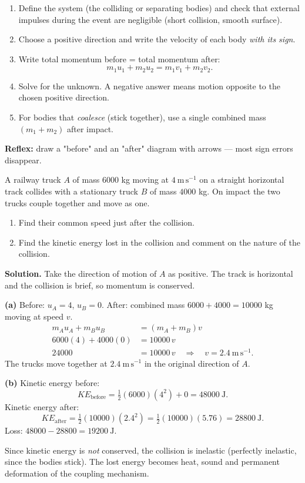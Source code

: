 \documentclass[11pt]{article}
\newcommand{\cle}[1]{{\popxbold\color{popdark}#1}}
\begin{document}
\begin{methode}
\begin{enumerate}
\item Define the \cle{system} (the colliding or separating bodies) and check that external impulses during the event are negligible (short collision, smooth surface).
\item Choose a positive direction and write the velocity of each body \emph{with its sign}.
\item Write total momentum before = total momentum after:
\[ m_1u_1+m_2u_2=m_1v_1+m_2v_2. \]
\item Solve for the unknown. A negative answer means motion opposite to the chosen positive direction.
\item For bodies that \emph{coalesce} (stick together), use a single combined mass $(m_1+m_2)$ after impact.
\end{enumerate}
\textbf{Reflex:} draw a "before" and an "after" diagram with arrows — most sign errors disappear.
\end{methode}

\begin{exoresolu}
A railway truck $A$ of mass $6000$ kg moving at $4\ \mathrm{m\,s^{-1}}$ on a straight horizontal track collides with a stationary truck $B$ of mass $4000$ kg. On impact the two trucks couple together and move as one.
\begin{enumerate}
\item[(a)] Find their common speed just after the collision.
\item[(b)] Find the kinetic energy lost in the collision and comment on the nature of the collision.
\end{enumerate}
\tcblower
\textbf{Solution.} Take the direction of motion of $A$ as positive. The track is horizontal and the collision is brief, so momentum is conserved.

\textbf{(a)} Before: $u_A=4$, $u_B=0$. After: combined mass $6000+4000=10000$ kg moving at speed $v$.
\begin{align*}
m_Au_A+m_Bu_B&=(m_A+m_B)v\\
6000(4)+4000(0)&=10000\,v\\
24000&=10000\,v \quad\Longrightarrow\quad v=2.4\ \mathrm{m\,s^{-1}}.
\end{align*}
The trucks move together at $2.4\ \mathrm{m\,s^{-1}}$ in the original direction of $A$.

\textbf{(b)} Kinetic energy before:
\[ KE_{\text{before}}=\tfrac12(6000)(4^2)+0=48000\ \mathrm{J}. \]
Kinetic energy after:
\[ KE_{\text{after}}=\tfrac12(10000)(2.4^2)=\tfrac12(10000)(5.76)=28800\ \mathrm{J}. \]
Loss: $48000-28800=19200\ \mathrm{J}$.

Since kinetic energy is \emph{not} conserved, the collision is \cle{inelastic} (perfectly inelastic, since the bodies stick). The lost energy becomes heat, sound and permanent deformation of the coupling mechanism.
\end{exoresolu}
\end{document}
